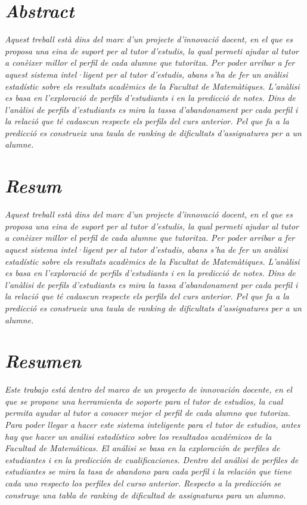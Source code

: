 \documentclass[12pt,a4paper,catalan]{article}
\begin{document}



\section*{\textit{Abstract}}

\textit{Aquest treball està dins del marc d'un projecte d'innovació docent, en el que es proposa una eina de suport per al tutor d'estudis, la qual permeti ajudar al tutor a conèixer millor el perfil de cada alumne que tutoritza. Per poder arribar a fer aquest sistema intel·ligent per al tutor d'estudis, abans s'ha de fer un anàlisi estadístic sobre els resultats acadèmics de la Facultat de Matemàtiques. L'anàlisi es basa en l'exploració de perfils d'estudiants i en la predicció de notes. Dins de l'anàlisi de perfils d'estudiants es mira la tassa d'abandonament per cada perfil i la relació que té cadascun respecte els perfils del curs anterior. Pel que fa a la predicció es construeix una taula de ranking de dificultats d'assignatures per a un alumne.}

\section*{\textit{Resum}}
\textit{Aquest treball està dins del marc d'un projecte d'innovació docent, en el que es proposa una eina de suport per al tutor d'estudis, la qual permeti ajudar al tutor a conèixer millor el perfil de cada alumne que tutoritza. Per poder arribar a fer aquest sistema intel·ligent per al tutor d'estudis, abans s'ha de fer un anàlisi estadístic sobre els resultats acadèmics de la Facultat de Matemàtiques. L'anàlisi es basa en l'exploració de perfils d'estudiants i en la predicció de notes. Dins de l'anàlisi de perfils d'estudiants es mira la tassa d'abandonament per cada perfil i la relació que té cadascun respecte els perfils del curs anterior. Pel que fa a la predicció es construeix una taula de ranking de dificultats d'assignatures per a un alumne.}


\section*{\textit{Resumen}}
\textit{Este trabajo está dentro del marco de un proyecto de innovación docente, en el que se propone una herramienta de soporte para el tutor de estudios, la cual permita ayudar al tutor a conocer mejor el perfil de cada alumno que tutoriza. Para poder llegar a hacer este sistema inteligente para el tutor de estudios, antes hay que hacer un análisi estadístico sobre los resultados académicos de la Facultad de Matemáticas. El análisi se basa en la exploración de perfiles de estudiantes i en la predicción de cualificaciones. Dentro del análisi de perfiles de estudiantes se mira la tasa de abandono para cada perfil i la relación que tiene cada uno respecto los perfiles del curso anterior. Respecto a la predicción se construye una tabla de ranking de dificultad de assignaturas para un alumno.}
\end{document}
